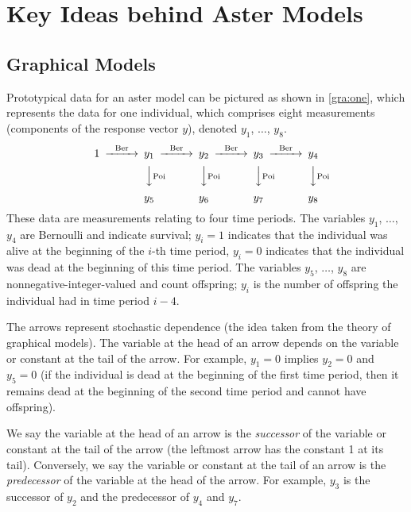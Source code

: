 \documentclass[11pt]{article}
\begin{document}
\section{Key Ideas behind Aster Models}

\subsection{Graphical Models}

Prototypical data for an aster model can be pictured as shown
in \eqref{gra:one}, which represents the data for one individual, which
comprises eight measurements (components of the response vector $y$),
denoted $y_1$, $\ldots$, $y_8$.
\begin{equation} \label{gra:one}
\begin{CD}
   1
   @>\text{Ber}>>
   y_1
   @>\text{Ber}>>
   y_2
   @>\text{Ber}>>
   y_3
   @>\text{Ber}>>
   y_4
   \\
   @.
   @VV\text{Poi}V
   @VV\text{Poi}V
   @VV\text{Poi}V
   @VV\text{Poi}V
   \\
   \hphantom{1}
   @.
   y_5
   @.
   y_6
   @.
   y_7
   @.
   y_8
\end{CD}
\end{equation}
These data are measurements relating to four time periods.
The variables $y_1$, $\ldots$, $y_4$ are Bernoulli and indicate
survival; $y_i = 1$ indicates that the individual was alive at the beginning
of the $i$-th time period, $y_i = 0$ indicates that the individual was dead
at the beginning of this time period.
The variables $y_5$, $\ldots$, $y_8$ are nonnegative-integer-valued
and count offspring; $y_i$ is
the number of offspring the individual had in time period $i - 4$.

The arrows represent stochastic dependence (the idea taken from the theory of
graphical models).  The variable at the head of
an arrow depends on the variable or constant at the tail of the arrow.
For example,
$y_1 = 0$ implies $y_2 = 0$ and $y_5 = 0$ (if the individual is dead
at the beginning of the first time period, then it remains dead at the
beginning of the second time period and cannot have offspring).

We say the variable at the head of an arrow is the \emph{successor} of
the variable or constant at the tail of the arrow (the leftmost arrow has
the constant 1 at its tail).
Conversely, we say the variable or constant at the tail of an arrow is
the \emph{predecessor} of the variable at the head of the arrow.
For example, $y_3$ is the successor of $y_2$ and the predecessor of $y_4$
and $y_7$.
\end{document}
